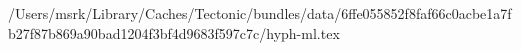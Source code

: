 /Users/msrk/Library/Caches/Tectonic/bundles/data/6ffe055852f8faf66c0acbe1a7fb27f87b869a90bad1204f3bf4d9683f597c7c/hyph-ml.tex
